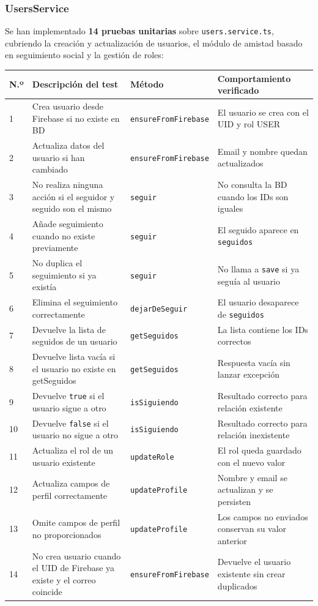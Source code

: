 \subsubsection{UsersService}

Se han implementado \textbf{14 pruebas unitarias} sobre \texttt{users.service.ts}, cubriendo la creación y actualización de usuarios, el módulo de amistad basado en seguimiento social y la gestión de roles:

\begin{longtable}{|p{0.5cm}|p{5.5cm}|p{3.8cm}|p{4.5cm}|}
\hline
\textbf{N.º} & \textbf{Descripción del test} & \textbf{Método} & \textbf{Comportamiento verificado} \\
\hline
1 & Crea usuario desde Firebase si no existe en BD & \texttt{ensureFromFirebase} & El usuario se crea con el UID y rol USER \\
\hline
2 & Actualiza datos del usuario si han cambiado & \texttt{ensureFromFirebase} & Email y nombre quedan actualizados \\
\hline
3 & No realiza ninguna acción si el seguidor y seguido son el mismo & \texttt{seguir} & No consulta la BD cuando los IDs son iguales \\
\hline
4 & Añade seguimiento cuando no existe previamente & \texttt{seguir} & El seguido aparece en \texttt{seguidos} \\
\hline
5 & No duplica el seguimiento si ya existía & \texttt{seguir} & No llama a \texttt{save} si ya seguía al usuario \\
\hline
6 & Elimina el seguimiento correctamente & \texttt{dejarDeSeguir} & El usuario desaparece de \texttt{seguidos} \\
\hline
7 & Devuelve la lista de seguidos de un usuario & \texttt{getSeguidos} & La lista contiene los IDs correctos \\
\hline
8 & Devuelve lista vacía si el usuario no existe en getSeguidos & \texttt{getSeguidos} & Respuesta vacía sin lanzar excepción \\
\hline
9 & Devuelve \texttt{true} si el usuario sigue a otro & \texttt{isSiguiendo} & Resultado correcto para relación existente \\
\hline
10 & Devuelve \texttt{false} si el usuario no sigue a otro & \texttt{isSiguiendo} & Resultado correcto para relación inexistente \\
\hline
11 & Actualiza el rol de un usuario existente & \texttt{updateRole} & El rol queda guardado con el nuevo valor \\
\hline
12 & Actualiza campos de perfil correctamente & \texttt{updateProfile} & Nombre y email se actualizan y se persisten \\
\hline
13 & Omite campos de perfil no proporcionados & \texttt{updateProfile} & Los campos no enviados conservan su valor anterior \\
\hline
14 & No crea usuario cuando el UID de Firebase ya existe y el correo coincide & \texttt{ensureFromFirebase} & Devuelve el usuario existente sin crear duplicados \\
\hline
\end{longtable}

